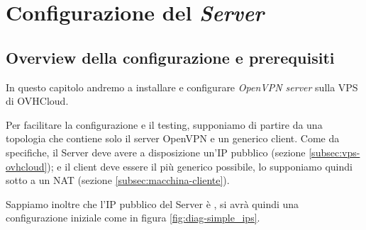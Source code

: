\chapter{Configurazione del \textit{Server} \ok}
\label{ch:server}

\section{Overview della configurazione e prerequisiti \ok}
\label{sec:overview_server}

In questo capitolo andremo a installare e configurare \textit{OpenVPN server} sulla VPS di OVHCloud.

Per facilitare la configurazione e il testing, supponiamo di partire da una topologia che contiene solo il server OpenVPN e un generico client. Come da specifiche, il Server deve avere a disposizione un'IP pubblico (sezione \ref{subsec:vps-ovhcloud}); e il client deve essere il più generico possibile, lo supponiamo quindi sotto a un NAT (sezione \ref{subsec:macchina-cliente}).

Sappiamo inoltre che l'IP pubblico del Server è , si avrà quindi una configurazione iniziale come in figura \ref{fig:diag-simple_ips}.


